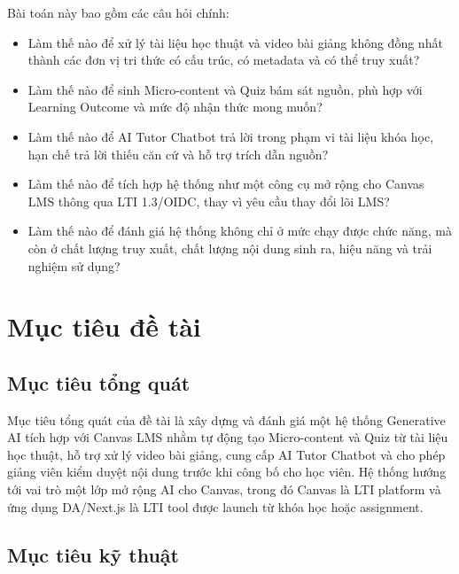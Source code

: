 Bài toán này bao gồm các câu hỏi chính:
\begin{itemize}
    \item Làm thế nào để xử lý tài liệu học thuật và video bài giảng không
          đồng nhất thành các đơn vị tri thức có cấu trúc, có metadata và có
          thể truy xuất?
    \item Làm thế nào để sinh Micro-content và Quiz bám sát nguồn, phù hợp
          với Learning Outcome và mức độ nhận thức mong muốn?
    \item Làm thế nào để AI Tutor Chatbot trả lời trong phạm vi tài liệu khóa
          học, hạn chế trả lời thiếu căn cứ và hỗ trợ trích dẫn nguồn?
    \item Làm thế nào để tích hợp hệ thống như một công cụ mở rộng cho Canvas
          LMS thông qua LTI 1.3/OIDC, thay vì yêu cầu thay đổi lõi LMS?
    \item Làm thế nào để đánh giá hệ thống không chỉ ở mức chạy được chức năng,
          mà còn ở chất lượng truy xuất, chất lượng nội dung sinh ra, hiệu năng
          và trải nghiệm sử dụng?
\end{itemize}

\section{Mục tiêu đề tài}

\subsection{Mục tiêu tổng quát}

Mục tiêu tổng quát của đề tài là xây dựng và đánh giá một hệ thống Generative
AI tích hợp với Canvas LMS nhằm tự động tạo Micro-content và Quiz từ tài liệu
học thuật, hỗ trợ xử lý video bài giảng, cung cấp AI Tutor Chatbot và cho phép
giảng viên kiểm duyệt nội dung trước khi công bố cho học viên. Hệ thống hướng
tới vai trò một lớp mở rộng AI cho Canvas, trong đó Canvas là LTI platform và
ứng dụng DA/Next.js là LTI tool được launch từ khóa học hoặc assignment.

\subsection{Mục tiêu kỹ thuật}

